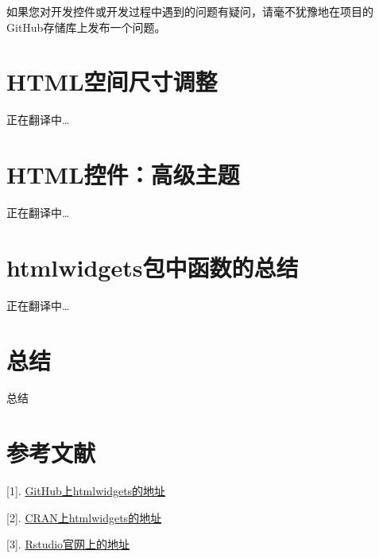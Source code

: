 \documentclass[]{book}
\theoremstyle{definition}
\theoremstyle{definition}
\theoremstyle{definition}
\theoremstyle{remark}
\begin{document}
如果您对开发控件或开发过程中遇到的问题有疑问，请毫不犹豫地在项目的GitHub存储库上发布一个问题。

\chapter{HTML空间尺寸调整}\label{htmlwidgets-Sizing}

正在翻译中\ldots{}

\chapter{HTML控件：高级主题}\label{htmlwidgets-advanced}

正在翻译中\ldots{}

\chapter{htmlwidgets包中函数的总结}\label{htmlwidgets-pkgintro}

正在翻译中\ldots{}

\chapter{总结}\label{summary}

总结

\chapter{参考文献}\label{reference}

{[}1{]}.
\href{https://github.com/ramnathv/htmlwidgets}{GitHub上htmlwidgets的地址}

{[}2{]}.
\href{https://CRAN.R-project.org/package=htmlwidgets}{CRAN上htmlwidgets的地址}

{[}3{]}. \href{https://www.htmlwidgets.org/}{Rstudio官网上的地址}


\end{document}
